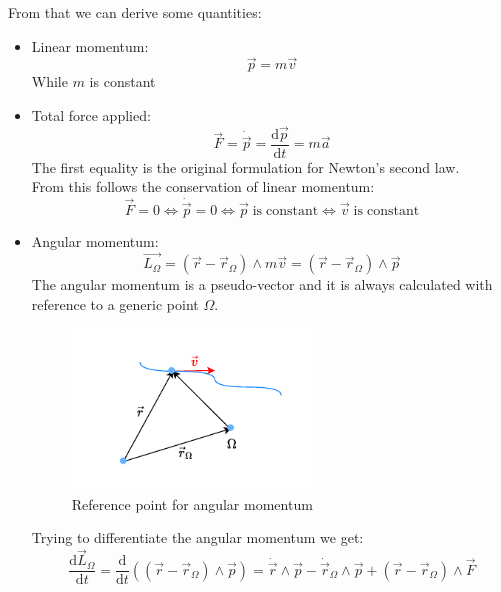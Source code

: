 From that we can derive some quantities:
\begin{itemize}
    \item Linear momentum: \begin{equation}\vec{p}=m\vec{v}\end{equation} While $m$ is constant
    \item Total force applied: \begin{equation}\vec{F}=\dot{\vec{p}}=\dfrac{\mathrm{d} \vec{p}}{\mathrm{d} t}=m\vec{a}\end{equation}The first equality is the original formulation for Newton's second law.\\From this follows the conservation of linear momentum:
    \begin{equation}\vec{F}=0 \iff\dot{\vec{p}}=0 \iff\vec{p}\;\mathrm{is\;constant} \iff\vec{v}\;\mathrm{is\;constant}\end{equation}
    \item Angular momentum:
    \begin{equation}
        \vec{L_{\Omega}} = \left(\vec{r}-\vec{r}_{\Omega}\right) \wedge m\vec{v} = \left(\vec{r}-\vec{r}_{\Omega}\right) \wedge \vec{p}
    \end{equation}
    The angular momentum is a pseudo-vector and it is always calculated with reference to a generic point $\Omega$.
    \begin{figure}[H]
        \centering
        \includegraphics[width=0.6\textwidth]{res/svg/omegareference.drawio}
        \caption{Reference point for angular momentum}
        \label{fig:image2}
    \end{figure}
    Trying to differentiate the angular momentum we get:
    \begin{equation}
        \dfrac{\mathrm{d}\vec{L}_{\Omega}}{\mathrm{d}t} = \dfrac{\mathrm{d}}{\mathrm{d}t}\left(\left(\vec{r}-\vec{r}_{\Omega}\right) \wedge \vec{p}\right) = \dot{\vec{r}}\wedge\vec{p} - \dot{\vec{r}}_{\Omega}\wedge\vec{p} + \left(\vec{r}-\vec{r}_{\Omega}\right) \wedge \vec{F}

\end{equation}
\end{itemize}
